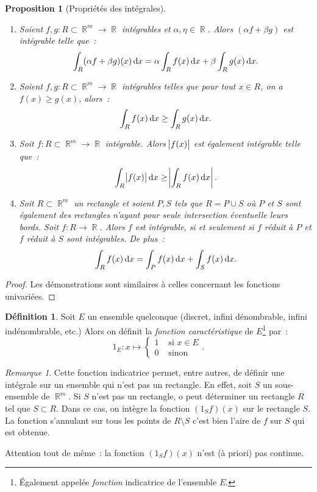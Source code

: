 \documentclass{article}
\DeclareMathOperator{\R}{\mathbb R}
\newtheorem{prp}[thm]{Proposition}
\theoremstyle{definition}
\newtheorem{déf}[thm]{Définition}
\theoremstyle{remark}
\newtheorem*{rmq}{Remarque}
\begin{document}
		\begin{prp}[Propriétés des intégrales]
		\begin{enumerate}
			\item Soient $f, g : R \subset \R^m \to \R$ intégrables et $\alpha, \eta \in \R$. Alors $(\alpha f + \beta g)$ est intégrable telle que~:
				\[\int_R (\alpha f + \beta g)(x)\dif x = \alpha \int_R f(x)\dif x + \beta \int_R g(x)\dif x.\]
			\item Soient $f, g : R \subset \R^m \to \R$ intégrables telles que pour tout $x \in R$, on a $f(x) \geq g(x)$, alors~:
				\[\int_R f(x)\dif x \geq \int_R g(x)\dif x.\]
			\item Soit $f : R \subset \R^m \to \R$ intégrable. Alors $\abs{f(x)}$ est également intégrable telle que~:
				\[\int_R \abs{f(x)}\dif x \geq \abs{\int_R f(x)\dif x}.\]
			\item Soit $R \subset \R^m$ un rectangle et soient $P, S$ tels que $R = P \cup S$ où $P$ et $S$ sont également des rectangles n'ayant pour seule
				intersection éventuelle leurs bords. Soit $f : R \to \R$. Alors $f$ est intégrable, si et seulement si $f$  réduit à $P$ et $f$ réduit à $S$
				sont intégrables. De plus~:
				\[\int_R f(x)\dif x = \int_P f(x)\dif x + \int_S f(x)\dif x.\]
		\end{enumerate}
		\end{prp}

		\begin{proof} Les démonstrations sont similaires à celles concernant les fonctions univariées. \end{proof}

		\begin{déf} Soit $E$ un ensemble quelconque (discret, infini dénombrable, infini indénombrable, etc.) Alors on définit la \emph{fonction caractéristique}
		de $E$\footnote{Également appelée \emph{fonction} indicatrice de l'ensemble $E$.} par~:
		\[1_E : x \mapsto \begin{cases}1 &\text{ si }x \in E\\0 &\text{ sinon}\end{cases}.\]
		\end{déf}

		\begin{rmq} Cette fonction indicatrice permet, entre autres, de définir une intégrale sur un ensemble qui n'est pas un rectangle. En effet, soit $S$
		un sous-ensemble de $\R^m$. Si $S$ n'est pas un rectangle, o peut déterminer un rectangle $R$ tel que $S \subset R$. Dans ce cas, on intègre la fonction
		$(1_Sf)(x)$ sur le rectangle $S$. La fonction s'annulant sur tous les points de $R \setminus S$ c'est bien l'aire de $f$ sur $S$ qui est obtenue.

		Attention tout de même~: la fonction $(1_Sf)(x)$ n'est (à priori) pas continue.
		\end{rmq}
\end{document}
